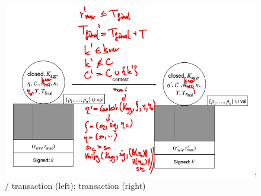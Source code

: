 \begin{figure}

  \centering

  \includegraphics[width=\textwidth/2]{figures/SM_closed_closed.png}

  \caption{\mtxClose{}/\mtxContest{} transaction (left); \mtxContest{} transaction (right)}\label{fig:SM_closed_closed}

\end{figure}



